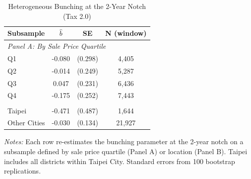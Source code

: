 \begin{table}[htbp]
\centering
\caption{Heterogeneous Bunching at the 2-Year Notch (Tax 2.0)}
\label{tab:heterogeneity}
\begin{tabular}{lccc}
\toprule
Subsample & $\hat{b}$ & SE & N (window) \\
\midrule
\multicolumn{4}{l}{\textit{Panel A: By Sale Price Quartile}} \\
\addlinespace
Q1 & -0.080 & (0.298) & 4,405 \\
Q2 & -0.014 & (0.249) & 5,287 \\
Q3 & 0.047 & (0.231) & 6,436 \\
Q4 & -0.175 & (0.252) & 7,443 \\
\addlinespace
\multicolumn{4}{l}{\textit{Panel B: By Location}} \\
\addlinespace
Taipei & -0.471 & (0.487) & 1,644 \\
Other Cities & -0.030 & (0.134) & 21,927 \\
\bottomrule
\end{tabular}
\vspace{0.3em}
{\footnotesize
\textit{Notes:} Each row re-estimates the bunching parameter at the 2-year notch on a subsample defined by sale price quartile (Panel A) or location (Panel B). Taipei includes all districts within Taipei City. Standard errors from 100 bootstrap replications.
\par}
\end{table}

